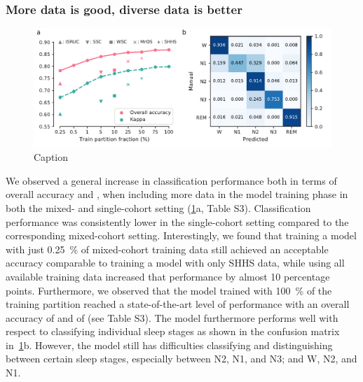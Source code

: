 \subsubsection{More data is good, diverse data is better}
\begin{figure}
    \centering
    \includegraphics[width=\columnwidth]{figures/paper-ii/figure_04_a-b.pdf}
    \caption{Caption}
    \label{fig:paper-ii-figure4}
\end{figure}
We observed a general increase in classification performance both in terms of overall accuracy and \cohen, when including more data in the model training phase in both the mixed- and single-cohort setting (\cref{fig:paper-ii-figure4}a, Table S3).
Classification performance was consistently lower in the single-cohort setting compared to the corresponding mixed-cohort setting. 
Interestingly, we found that training a model with just \SI{0.25}{\percent} of mixed-cohort training data still achieved an acceptable accuracy comparable to training a model with only SHHS data, while using all available training data increased that performance by almost 10 percentage points.
Furthermore, we observed that the model trained with \SI{100}{\percent} of the training partition reached a state-of-the-art level of performance with an overall accuracy of  and \cohen of  (see Table S3).
The model furthermore performs well with respect to classifying individual sleep stages as shown in the confusion matrix in~\cref{fig:paper-ii-figure4}b.
However, the model still has difficulties classifying and distinguishing between certain sleep stages, especially between N2, N1, and N3; and W, N2, and N1.

